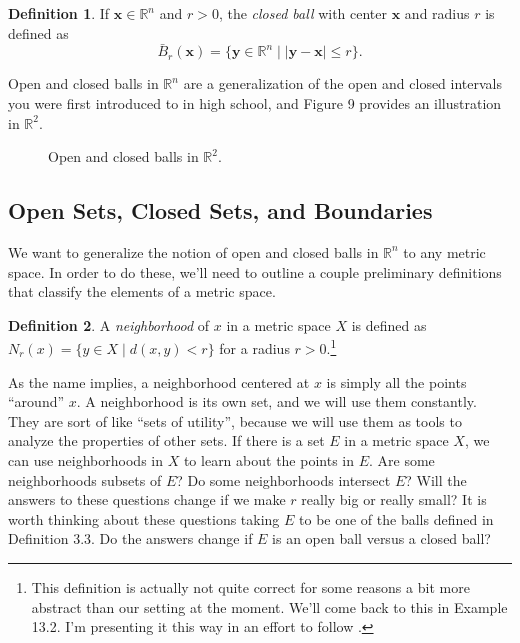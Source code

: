 \documentclass{article}
\newcommand{\R}{\mathbb{R}}
\newcommand{\x}{\mathbf{x}}
\newcommand{\y}{\mathbf{y}}
\theoremstyle{definition}
\newtheorem{definition}{Definition}[section]
\begin{document}
	\begin{definition}\label{def}
		If $ \x\in\R^n $ and $ r>0 $, the \textit{\color{red} closed ball} with center $ \x $ and radius $ r $ is defined as $$ \bar{B}_r(\x)=\{\y\in\R^n\mid|\y-\x|\le r\}. $$ 
	\end{definition}
	Open and closed balls in $ \R^n $ are a generalization of the open and closed intervals you were first introduced to in high school, and Figure 9 provides an illustration in $ \R^2 $. 
	\begin{figure}[h!]
		\centering
		\caption{Open and closed balls in $ \R^2 $.}
	\end{figure}  
	\subsection{Open Sets, Closed Sets, and Boundaries}
	We want to generalize the notion of open and closed balls in $ \R^n $ to any metric space. In order to do these, we'll need to outline a couple preliminary definitions that classify the elements of a metric space. 
	\begin{definition}\label{def}
		A \textit{\color{red}neighborhood } of $ x $ in a metric space $ X $ is defined as $ N_r(x)=\{y\in X\mid d(x,y)<r\} $ for a radius $ r>0 $.\footnote{This definition is actually not quite correct for some reasons a bit more abstract than our setting at the moment. We'll come back to this in Example 13.2. I'm presenting it this way in an effort to follow \cite{rudin1964principles}.}   
	\end{definition}
	As the name implies, a neighborhood centered at $ x $ is simply all the points ``around'' $ x $. A neighborhood is its own set, and we will use them constantly. They are sort of like ``sets of utility'', because we will use them as tools to analyze the properties of other sets. If there is a set $ E $ in a metric space $ X $, we can use neighborhoods in $ X $ to learn about the points in $ E $. Are some neighborhoods subsets of $ E $? Do some neighborhoods intersect $ E $? Will the answers to these questions change if we make $ r $ really big or really small? It is worth thinking about these questions taking $ E $ to be one of the balls defined in Definition 3.3. Do the answers change if $ E $ is an open ball versus a closed ball? 
	
\end{document}
